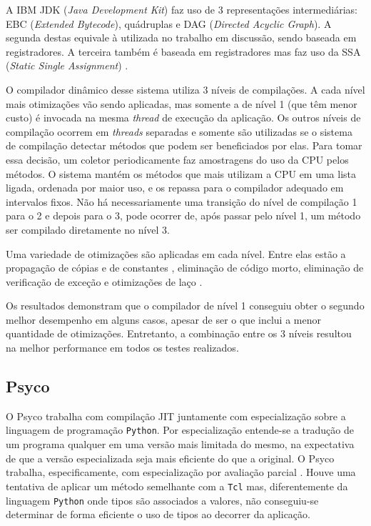A IBM JDK (\textit{Java Development Kit}) faz uso de 3 representações
intermediárias: EBC
(\textit{Extended Bytecode}), quádruplas e DAG (\textit{Directed
  Acyclic Graph}). A segunda destas equivale à utilizada no trabalho
em discussão, sendo baseada em registradores. A terceira também é
baseada em registradores mas faz uso da SSA (\textit{Static Single
  Assignment}) \cite{cytron}.

O compilador dinâmico desse sistema utiliza 3 níveis de compilações. A
cada nível mais otimizações vão sendo aplicadas, mas somente a de
nível 1 (que têm menor custo) é invocada na mesma \textit{thread} de
execução da aplicação. Os outros níveis de compilação ocorrem em
\textit{threads} separadas e somente são utilizadas se o sistema
de compilação detectar métodos que podem ser beneficiados por
elas. Para tomar essa decisão, um coletor periodicamente faz
amostragens do uso da CPU pelos métodos. O sistema mantém os métodos
que mais utilizam a CPU em uma lista ligada, ordenada por maior uso, e
os repassa para o compilador adequado em intervalos fixos. Não há
necessariamente uma transição do nível de compilação 1 para o 2 e
depois para o 3, pode ocorrer de, após passar pelo nível 1, um método
ser compilado diretamente no nível 3.

Uma variedade de otimizações são aplicadas em cada nível. Entre elas
estão a  propagação de cópias e de constantes \cite{optconstprog},
eliminação de código morto,
eliminação de verificação de exceção \cite{optelimverifcexec} e
otimizações de laço \cite{muchnick}.

Os resultados demonstram que o compilador de nível 1 conseguiu obter o
segundo melhor desempenho em alguns casos, apesar de ser o que inclui
a menor quantidade de otimizações. Entretanto, a combinação entre os 3
níveis resultou na melhor performance em todos os testes realizados.

\subsection{Psyco}

O Psyco \cite{psyco} trabalha com compilação JIT juntamente com
especialização sobre a linguagem de programação \texttt{Python}.
Por especialização entende-se a tradução de um programa qualquer em
uma versão mais limitada do mesmo, na expectativa de que a versão
especializada seja mais eficiente do que a original. O Psyco trabalha,
especificamente, com especialização por avaliação parcial
\cite{partialeval}. Houve uma tentativa de aplicar um método
semelhante com a \texttt{Tcl} mas, diferentemente da linguagem
\texttt{Python} onde tipos são associados a valores, não conseguiu-se
determinar de forma eficiente o uso de tipos ao decorrer da aplicação.


